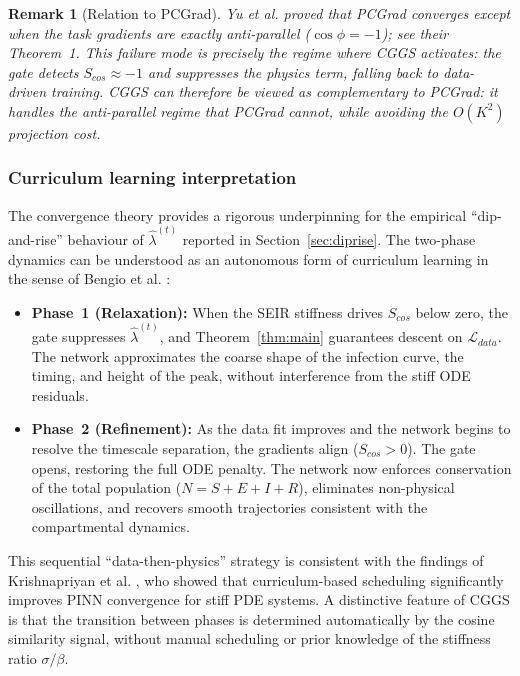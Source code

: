 \documentclass[11pt]{article}
\newtheorem{remark}[thm]{Remark}
\begin{document}
\begin{remark}[Relation to PCGrad]
Yu et al. \cite{yu2020gradient} proved that PCGrad converges except when the task gradients are exactly anti-parallel ($\cos\phi = -1$); see their Theorem~1. This failure mode is precisely the regime where CGGS activates: the gate detects $S_{cos} \approx -1$ and suppresses the physics term, falling back to data-driven training. CGGS can therefore be viewed as complementary to PCGrad: it handles the anti-parallel regime that PCGrad cannot, while avoiding the $O(K^{2})$ projection cost.
\end{remark}


\subsubsection{Curriculum learning interpretation}

The convergence theory provides a rigorous underpinning for the empirical ``dip-and-rise'' behaviour of $\hat{\lambda}^{(t)}$ reported in Section~\ref{sec:diprise}. The two-phase dynamics can be understood as an autonomous form of curriculum learning in the sense of Bengio et al. \cite{bengio2009curriculum}:

\begin{itemize}
    \item \textbf{Phase~1 (Relaxation):} When the SEIR stiffness drives $S_{cos}$ below zero, the gate suppresses $\hat{\lambda}^{(t)}$, and Theorem~\ref{thm:main} guarantees descent on $\mathcal{L}_{data}$. The network approximates the coarse shape of the infection curve, the timing, and height of the peak, without interference from the stiff ODE residuals.

    \item \textbf{Phase~2 (Refinement):} As the data fit improves and the network begins to resolve the timescale separation, the gradients align ($S_{cos} > 0$). The gate opens, restoring the full ODE penalty. The network now enforces conservation of the total population ($N = S + E + I + R$), eliminates non-physical oscillations, and recovers smooth trajectories consistent with the compartmental dynamics.
\end{itemize}

This sequential ``data-then-physics'' strategy is consistent with the findings of Krishnapriyan et al. \cite{krishnapriyan2021characterizing}, who showed that curriculum-based scheduling significantly improves PINN convergence for stiff PDE systems. A distinctive feature of CGGS is that the transition between phases is determined automatically by the cosine similarity signal, without manual scheduling or prior knowledge of the stiffness ratio $\sigma/\beta$.
\end{document}
